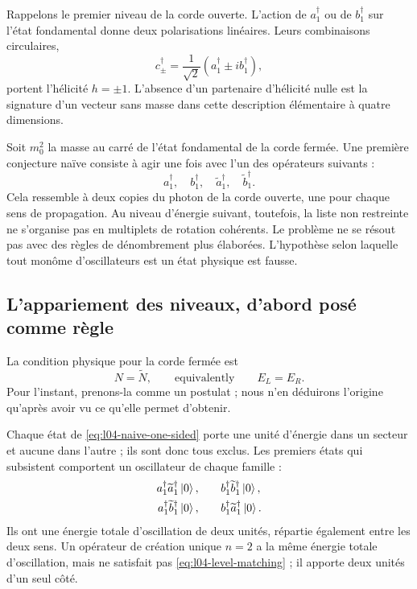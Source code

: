 Rappelons le premier niveau de la corde ouverte. L’action de \(a_1^\dagger\) ou de \(b_1^\dagger\) sur l’état fondamental donne deux polarisations linéaires. Leurs combinaisons circulaires,
\begin{equation}
  c_\pm^\dagger
  =
  \frac{1}{\sqrt2}
  \left(a_1^\dagger\pm i b_1^\dagger\right),
  \label{eq:l04-open-circular}
\end{equation}
portent l’hélicité \(h=\pm1\). L’absence d’un partenaire d’hélicité nulle est la signature d’un vecteur sans masse dans cette description élémentaire à quatre dimensions.

Soit \(m_0^2\) la masse au carré de l’état fondamental de la corde fermée. Une première conjecture naïve consiste à agir une fois avec l’un des opérateurs suivants :
\begin{equation}
  a_1^\dagger,\quad b_1^\dagger,\quad
  \widetilde a_1^\dagger,\quad\widetilde b_1^\dagger.
  \label{eq:l04-naive-one-sided}
\end{equation}
Cela ressemble à deux copies du photon de la corde ouverte, une pour chaque sens de propagation. Au niveau d’énergie suivant, toutefois, la liste non restreinte ne s’organise pas en multiplets de rotation cohérents. Le problème ne se résout pas avec des règles de dénombrement plus élaborées. L’hypothèse selon laquelle tout monôme d’oscillateurs est un état physique est fausse.

\subsection{L’appariement des niveaux, d’abord posé comme règle}

La condition physique pour la corde fermée est
\begin{equation}
  N=\widetilde N,
  \qquad\text{equivalently}\qquad E_L=E_R.
  \label{eq:l04-level-matching}
\end{equation}
Pour l’instant, prenons-la comme un postulat ; nous n’en déduirons l’origine qu’après avoir vu ce qu’elle permet d’obtenir.

Chaque état de \eqref{eq:l04-naive-one-sided} porte une unité d’énergie dans un secteur et aucune dans l’autre ; ils sont donc tous exclus. Les premiers états qui subsistent comportent un oscillateur de chaque famille :
\begin{align}
  a_1^\dagger\widetilde a_1^\dagger\left\lvert0\right\rangle,
  &\qquad
  b_1^\dagger\widetilde b_1^\dagger\left\lvert0\right\rangle,
  \label{eq:l04-four-matched-a}\\
  a_1^\dagger\widetilde b_1^\dagger\left\lvert0\right\rangle,
  &\qquad
  b_1^\dagger\widetilde a_1^\dagger\left\lvert0\right\rangle.
  \label{eq:l04-four-matched-b}
\end{align}
Ils ont une énergie totale d’oscillation de deux unités, répartie également entre les deux sens. Un opérateur de création unique \(n=2\) a la même énergie totale d’oscillation, mais ne satisfait pas \eqref{eq:l04-level-matching} ; il apporte deux unités d’un seul côté.


